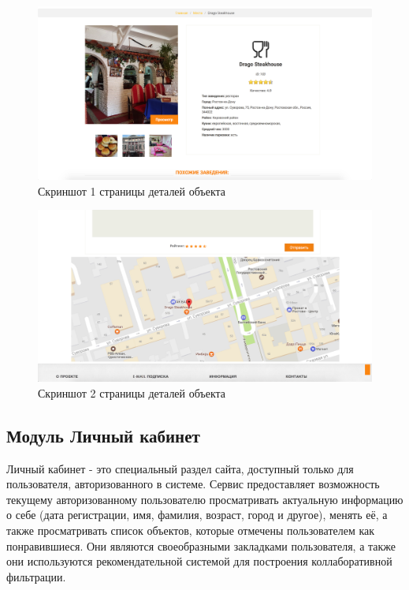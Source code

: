 \begin{figure}[H]%
	\centering
	\includegraphics[width=\textwidth]{img/places4.png}
	\caption{\label{fig:tan-aus}Скриншот 1 страницы деталей объекта}
\end{figure}

\begin{figure}[H]%
	\centering
	\includegraphics[width=\textwidth]{img/places5.png}
	\caption{\label{fig:tan-aus}Скриншот 2 страницы деталей объекта}
\end{figure}


\subsection{Модуль Личный кабинет}

Личный кабинет - это специальный раздел сайта, доступный только для пользователя, авторизованного в системе. Сервис предоставляет возможность текущему авторизованному пользователю просматривать актуальную информацию о себе (дата регистрации, имя, фамилия, возраст, город и другое), менять её, а также просматривать список объектов, которые отмечены пользователем как понравившиеся. Они являются своеобразными закладками пользователя, а также они используются рекомендательной системой для построения коллаборативной фильтрации.

